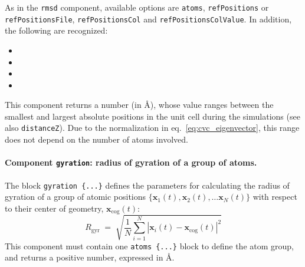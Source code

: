 As in the \texttt{rmsd} component, available options are
\texttt{atoms}, \texttt{refPositions} or \texttt{refPositionsFile},
\texttt{refPositionsCol} and \texttt{refPositionsColValue}.  In
addition, the following are recognized:
\begin{itemize}

\item %

\item %

\item %

\item %

\end{itemize}
This component returns a number (in \AA), whose value ranges between
the smallest and largest absolute positions in the unit cell during
the simulations (see also \texttt{distanceZ}).  Due to the
normalization in eq.~\ref{eq:cvc_eigenvector}, this range does not
depend on the number of atoms involved.


\paragraph*{Component \texttt{gyration}: radius of gyration of a group
  of atoms.}  The block \texttt{gyration~\{...\}} defines the
parameters for calculating the radius of gyration of a group of atomic
positions $\{ \mathbf{x}_1(t), \mathbf{x}_2(t), \ldots \mathbf{x}_N(t)
\}$ with respect to their center of geometry,
$\mathbf{x}_{\mathrm{cog}}(t)$:
\begin{equation}
  \label{eq:colvar_gyration}
  R_{\mathrm{gyr}} \; = \; \sqrt{ \frac{1}{N}
    \sum_{i=1}^{N} \left|\mathbf{x}_{i}(t) -
      \mathbf{x}_{\mathrm{cog}}(t)\right|^{2} }
\end{equation}
This component must contain one \texttt{atoms~\{...\}} block to
define the atom group, and returns a positive number, expressed in
\AA{}.


